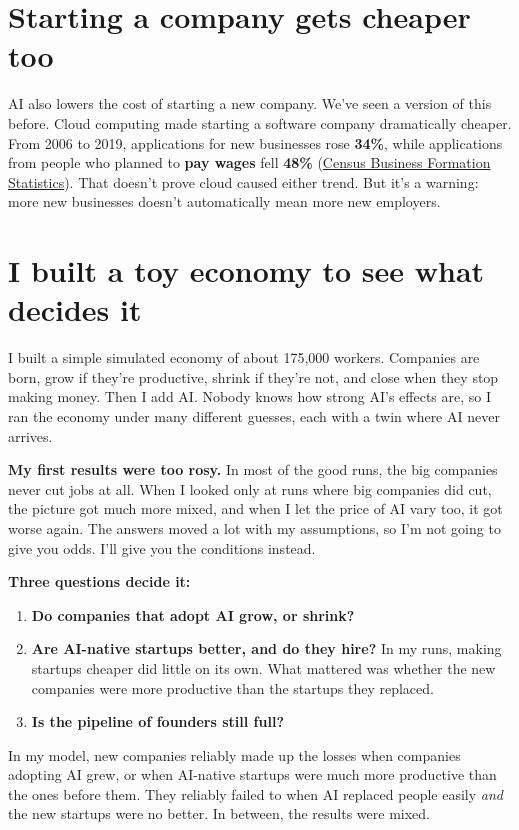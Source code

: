 \documentclass[11pt]{article}
\begin{document}
\section*{Starting a company gets cheaper too}

AI also lowers the cost of starting a new company. We've seen a version of this before. Cloud computing made starting a software company dramatically cheaper. From 2006 to 2019, applications for new businesses rose \textbf{34\%}, while applications from people who planned to \textbf{pay wages} fell \textbf{48\%} (\href{https://www.census.gov/econ/bfs/}{Census Business Formation Statistics}). That doesn't prove cloud caused either trend. But it's a warning: more new businesses doesn't automatically mean more new employers.

\section*{I built a toy economy to see what decides it}

I built a simple simulated economy of about 175,000 workers. Companies are born, grow if they're productive, shrink if they're not, and close when they stop making money. Then I add AI. Nobody knows how strong AI's effects are, so I ran the economy under many different guesses, each with a twin where AI never arrives.

\textbf{My first results were too rosy.} In most of the good runs, the big companies never cut jobs at all. When I looked only at runs where big companies did cut, the picture got much more mixed, and when I let the price of AI vary too, it got worse again. The answers moved a lot with my assumptions, so I'm not going to give you odds. I'll give you the conditions instead.

\textbf{Three questions decide it:}
\begin{enumerate}
  \item \textbf{Do companies that adopt AI grow, or shrink?}
  \item \textbf{Are AI-native startups better, and do they hire?} In my runs, making startups cheaper did little on its own. What mattered was whether the new companies were more productive than the startups they replaced.
  \item \textbf{Is the pipeline of founders still full?}
\end{enumerate}
In my model, new companies reliably made up the losses when companies adopting AI grew, or when AI-native startups were much more productive than the ones before them. They reliably failed to when AI replaced people easily \emph{and} the new startups were no better. In between, the results were mixed.
\end{document}
